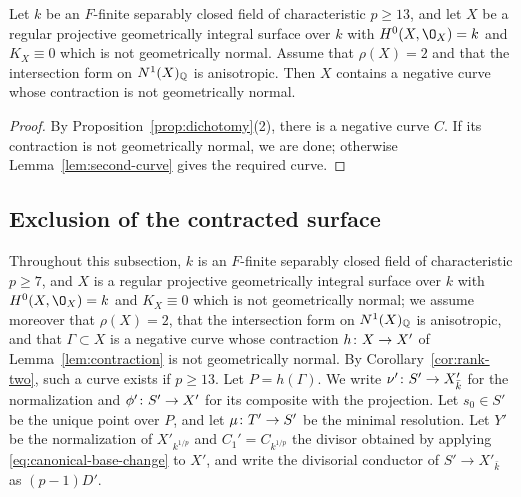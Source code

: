 \begin{corollary}\label{cor:rank-two}
Let $k$ be an $F$-finite separably closed field of characteristic $p\geq 13$, and let $X$ be a regular projective geometrically integral surface over $k$ with $H^0(X,\O_X) = k$ and $K_X\equiv 0$ which is not geometrically normal.
Assume that $\rho(X) = 2$ and that the intersection form on $N^1(X)_{\mathbb{Q}}$ is anisotropic.
Then $X$ contains a negative curve whose contraction is not geometrically normal.
\end{corollary}

\begin{proof}
By Proposition~\ref{prop:dichotomy}(2), there is a negative curve $C$.
If its contraction is not geometrically normal, we are done; otherwise Lemma~\ref{lem:second-curve} gives the required curve.
\end{proof}

\subsection{Exclusion of the contracted surface}\label{sec:rank-one}

Throughout this subsection, $k$ is an $F$-finite separably closed field of characteristic $p\geq 7$, and $X$ is a regular projective geometrically integral surface over $k$ with $H^0(X,\O_X) = k$ and $K_X\equiv 0$ which is not geometrically normal; we assume moreover that $\rho(X) = 2$, that the intersection form on $N^1(X)_{\mathbb{Q}}$ is anisotropic, and that $\Gamma\subset X$ is a negative curve whose contraction $h\colon X\to X'$ of Lemma~\ref{lem:contraction} is not geometrically normal.
By Corollary~\ref{cor:rank-two}, such a curve exists if $p\geq 13$.
Let $P = h(\Gamma)$.
We write $\nu'\colon S'\to X'_{\bar k}$ for the normalization and $\phi'\colon S'\to X'$ for its composite with the projection.
Let $s_0\in S'$ be the unique point over $P$, and let $\mu\colon T'\to S'$ be the minimal resolution.
Let $Y'$ be the normalization of $X'_{k^{1/p}}$ and $C_1' = C_{k^{1/p}}$ the divisor obtained by applying \eqref{eq:canonical-base-change} to $X'$, and write the divisorial conductor of $S'\to X'_{\bar k}$ as $(p-1)D'$.

